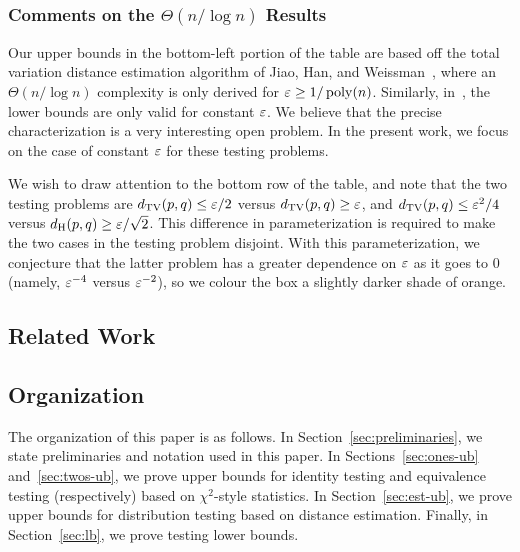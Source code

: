 \subsubsection{Comments on the $\Theta(n/\log n)$ Results}
\label{sec:nlogn}
Our upper bounds in the bottom-left portion of the table are based off the total variation distance estimation algorithm of Jiao, Han, and Weissman~\cite{JiaoHW16}, where an $\Theta(n/\log n)$ complexity is only derived for $\varepsilon \geq 1/\operatorname*{poly}(n)$.
Similarly, in~\cite{ValiantV10a}, the lower bounds are only valid for constant $\varepsilon$.
We believe that the precise characterization  is a very interesting open problem.
In the present work, we focus on the case of constant $\varepsilon$ for these testing problems.

We wish to draw attention to the bottom row of the table, and note that the two testing problems are $d_{\mathrm {TV}}(p,q) \leq \varepsilon/2$ versus $d_{\mathrm {TV}}(p,q) \geq \varepsilon$, and $d_{\mathrm {TV}}(p,q) \leq \varepsilon^2/4$ versus $d_{\mathrm {H}}(p,q) \geq \varepsilon/\sqrt{2}$.
This difference in parameterization is required to make the two cases in the testing problem disjoint.
With this parameterization, we conjecture that the latter problem has a greater dependence on $\varepsilon$ as it goes to $0$ (namely, $\varepsilon^{-4}$ versus $\varepsilon^{-2}$), so we colour the box a slightly darker shade of orange.

\subsection{Related Work}
\label{sec:related-work}


\subsection{Organization}
The organization of this paper is as follows.
In Section~\ref{sec:preliminaries}, we state preliminaries and notation used in this paper.
In Sections~\ref{sec:ones-ub} and~\ref{sec:twos-ub}, we prove upper bounds for identity testing and equivalence testing (respectively) based on $\chi^2$-style statistics.
In Section~\ref{sec:est-ub}, we prove upper bounds for distribution testing based on distance estimation.
Finally, in Section~\ref{sec:lb}, we prove testing lower bounds.
